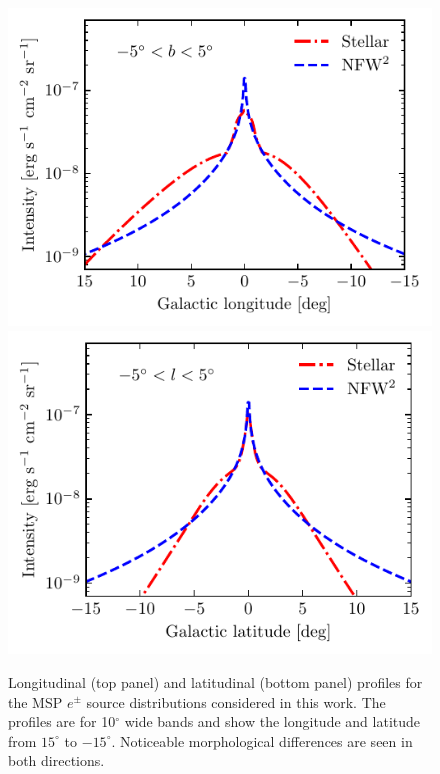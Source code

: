 \documentclass[%
reprint,
superscriptaddress,
amsmath,amssymb,
aps,
floatfix,
]{revtex4-1}
\begin{document}
\begin{figure}[t!]
  \includegraphics[width = \columnwidth]{injection_lon.pdf}
  \includegraphics[width = \columnwidth]{injection_lat.pdf}
  \caption{Longitudinal (top panel) and latitudinal (bottom panel)
    profiles for the MSP $e^\pm$ source distributions considered in this work. The profiles
    are for 10$^\circ$ wide bands and show the longitude and latitude
    from $15^\circ$ to $-15^\circ$. Noticeable morphological differences are seen in both directions.}
  \label{fig:injection_profile}
\end{figure}
\end{document}
